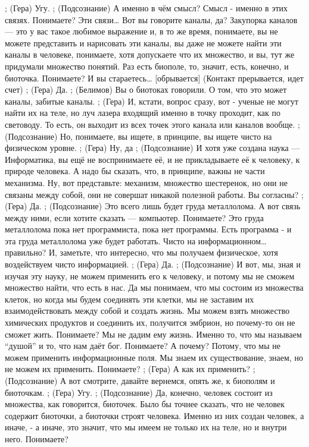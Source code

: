 ;	(Гера) Угу.
;	(Подсознание) А именно в чём смысл? Смысл -  именно в этих связях. Понимаете? Эти связи… Вот вы говорите каналы, да? Закупорка каналов — это у вас такое любимое выражение и, в то же время, понимаете, вы не можете представить и нарисовать эти каналы, вы даже не можете найти эти каналы в человеке, понимаете, хотя допускаете что их множество, и вы, тут же придумали множество понятий. Раз есть биополе, то, значит, есть, конечно, и биоточка. Понимаете? И вы стараетесь… [обрывается]
(Контакт прерывается, идет счет)
;	(Гера) Да.
;	(Белимов) Вы о биотоках говорили. О том, что это может каналы, забитые каналы.
;	(Гера) И, кстати, вопрос сразу, вот - ученые не могут найти их на теле, но луч лазера входящий именно в точку проходит, как по световоду. То есть, он выходит из всех точек этого канала или каналов вообще.
;	(Подсознание) Но, понимаете, вы ищете, в принципе, вы ищете чисто на физическом уровне.
;	(Гера) Ну, да
;	(Подсознание) И хотя уже создана наука — Информатика, вы ещё не воспринимаете её, и не прикладываете её к человеку, к природе человека. А надо бы сказать, что, в принципе, важны не части механизма. Ну, вот представьте: механизм, множество шестеренок, но они не связаны между собой, они не совершат никакой полезной работы. Вы согласны?
;	(Гера) Да.
;	(Подсознание) Это всего лишь будет груда металлолома. А вот связь между ними, если хотите сказать — компьютер. Понимаете? Это груда металлолома пока нет программиста, пока нет программы. Есть программа -  и эта груда металлолома уже будет работать. Чисто на информационном… правильно? И, заметьте, что интересно, что мы получаем физическое, хотя воздействуем чисто информацией. 
;	(Гера) Да.
;	(Подсознание) И вот, мы, зная и изучая эту науку, не можем применить его к человеку, и потому мы не сможем множество найти, что есть в нас. Да мы понимаем, что мы состоим из множества клеток, но когда мы будем соединять эти клетки, мы не заставим их взаимодействовать между собой и создать жизнь. Мы можем взять множество химических продуктов и соединить их, получится эмбрион, но почему-то он не сможет жить. Понимаете? Мы не дадим ему жизнь. Именно то, что мы называем ``душой'' и то, что нам даёт бог. Понимаете? А почему? Потому, что мы не можем применить информационные поля. Мы знаем их существование, знаем, но не можем их применить. Понимаете?
;	(Гера) А как их применить?
;	(Подсознание) А вот смотрите, давайте вернемся, опять же, к биополям и биоточкам.
;	(Гера) Угу.
;	(Подсознание) Да, конечно, человек состоит из множества, как говорится, биоточек. Было бы точнее сказать, что не человек содержит биоточки, а биоточки строят человека. Именно из них создан человек,  а иначе, - а иначе, это значит, что мы имеем не только их на теле, но и внутри него. Понимаете?
